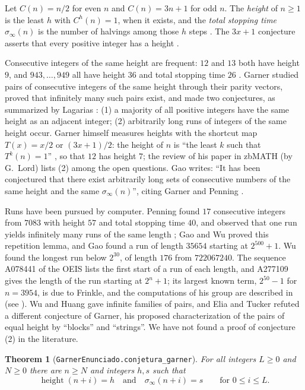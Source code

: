\documentclass[11pt]{amsart}
\newtheorem{theorem}{Theorem}[section]
\theoremstyle{definition}
\theoremstyle{remark}
\newcommand{\lean}[1]{\nolinkurl{#1}}
\begin{document}
Let $C(n)=n/2$ for even $n$ and $C(n)=3n+1$ for odd $n$. The \emph{height} of $n\ge1$ is the least $h$ with $C^{h}(n)=1$, when it exists, and the \emph{total stopping time} $\sigma_\infty(n)$ is the number of halvings among those $h$ steps \cite{Gao93}. The $3x+1$ conjecture asserts that every positive integer has a height \cite{Lag85,Lag10}.

Consecutive integers of the same height are frequent: $12$ and $13$ both have height $9$, and $943,\dots,949$ all have height $36$ and total stopping time $26$ \cite{Gao93}. Garner \cite{Gar85} studied pairs of consecutive integers of the same height through their parity vectors, proved that infinitely many such pairs exist, and made two conjectures, as summarized by Lagarias \cite[entry~72]{Lag03}: (1) a majority of all positive integers have the same height as an adjacent integer; (2) arbitrarily long runs of integers of the same height occur. Garner himself measures heights with the shortcut map $T(x)=x/2$ or $(3x+1)/2$: the height of $n$ is ``the least $k$ such that $T^k(n)=1$'' \cite{Gar85}, so that $12$ has height $7$; the review of his paper in zbMATH (by G.~Lord) lists (2) among the open questions. Gao \cite[p.~262]{Gao93} writes: ``It has been conjectured that there exist arbitrarily long sets of consecutive numbers of the same height and the same $\sigma_\infty(n)$'', citing Garner and Penning \cite{Pen89}.

Runs have been pursued by computer. Penning found $17$ consecutive integers from $7083$ with height $57$ and total stopping time $40$, and observed that one run yields infinitely many runs of the same length \cite{Pen89}; Gao \cite[Lemma~1]{Gao93} and Wu \cite{Wu93} proved this repetition lemma, and Gao found a run of length $35654$ starting at $2^{500}+1$. Wu \cite{Wu92} found the longest run below $2^{30}$, of length $176$ from $722067240$. The sequence A078441 of the OEIS lists the first start of a run of each length, and A277109 gives the length of the run starting at $2^n+1$; its largest known term, $2^{50}-1$ for $n=3954$, is due to Frinkle, and the computations of his group are described in \cite{Fri25} (see \cite{OEIS}). Wu and Huang \cite{WH01} gave infinite families of pairs, and Elia and Tucker \cite{ET15} refuted a different conjecture of Garner, his proposed characterization of the pairs of equal height by ``blocks'' and ``strings''. We have not found a proof of conjecture (2) in the literature.

\begin{theorem}[\lean{GarnerEnunciado.conjetura_garner}]\label{thm:main}
For all integers $L\ge0$ and $N\ge0$ there are $n\ge N$ and integers $h,s$ such that
\[
\operatorname{height}(n+i)=h\quad\text{and}\quad \sigma_\infty(n+i)=s\qquad\text{for } 0\le i\le L.
\]
\end{theorem}
\end{document}
